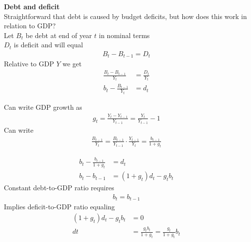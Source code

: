 \documentclass{beamer}
\begin{document}
\begin{frame}
  \textbf{Debt and deficit}\\
  Straightforward that debt is caused by budget deficits, but how does this work in relation to GDP?\\
  \medskip
  Let $B_t$ be debt at end of year $t$ in nominal terms\\
  $D_t$ is deficit and will equal
  \begin{align}
    B_t-B_{t-1}=D_t
 \end{align}  
  \medskip
  Relative to GDP $Y$ we get  
  \begin{align}
    \frac{B_t-B_{t-1}}{Y_t} &= \frac{D_t}{Y_t}\\
    b_t-\frac{B_{t-1}}{Y_t} &= d_t    
  \end{align}
\end{frame}

\begin{frame}
 Can write GDP growth as
 \begin{align}
   g_t=\frac{Y_t-Y_{t-1}}{Y_{t-1}}=\frac{Y_{t}}{Y_{t-1}}-1
 \end{align}
 \medskip
 Can write
 \begin{align}
   \frac{B_{t-1}}{Y_t} = \frac{B_{t-1}}{Y_{t-1}} \cdot \frac{Y_{t-1}}{Y_t} = \frac{b_{t-1}}{1+g_t}  
 \end{align}  
\end{frame}

\begin{frame}
  \begin{align}
    b_t-\frac{b_{t-1}}{1+g_t} &= d_t\\ \nonumber
  b_t-b_{t-1} &= (1+g_t)d_t-g_tb_t  
  \end{align}
  \medskip
  Constant debt-to-GDP ratio requires
  \begin{align}
    b_t=b_{t-1}
  \end{align}
  \medskip Implies deficit-to-GDP ratio equaling 
\begin{align}
  (1+g_t)d_t-g_tb_t &=0 \\ \nonumber
  dt &= \frac{g_tb_t}{1+g_t} = \frac{g_t}{1+g_t}b_t
\end{align}
\end{frame}
\end{document}
